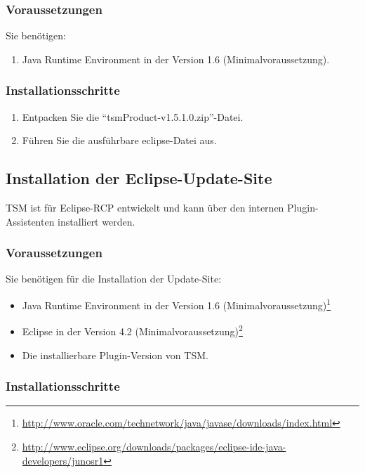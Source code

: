 \documentclass[11pt,a4paper,titlepage]{article}
\begin{document}
\subsubsection{Voraussetzungen}
Sie benötigen:
\begin{enumerate}
 \item Java Runtime Environment in der Version 1.6 (Minimalvoraussetzung).
\end{enumerate}

\subsubsection{Installationsschritte}
\begin{enumerate}
 \item Entpacken Sie die "`tsmProduct-v1.5.1.0.zip"'-Datei.
 \item Führen Sie die ausführbare eclipse-Datei aus.
\end{enumerate}


\subsection{Installation der Eclipse-Update-Site}
TSM ist für Eclipse-RCP entwickelt und kann über den internen Plugin-Assistenten installiert werden.


\subsubsection{Voraussetzungen}
Sie benötigen für die Installation der Update-Site:
\begin{itemize}
 \item Java Runtime Environment in der Version 1.6 (Minimalvoraussetzung)\footnote{\href{http://www.oracle.com/technetwork/java/javase/downloads/index.html}{http://www.oracle.com/technetwork/java/javase/downloads/index.html}}
 \item Eclipse in der Version 4.2 (Minimalvoraussetzung)\footnote{\href{http://www.eclipse.org/downloads/packages/eclipse-ide-java-developers/junosr1}{http://www.eclipse.org/downloads/packages/eclipse-ide-java-developers/junosr1}}
 \item Die installierbare Plugin-Version von TSM.
\end{itemize}

\subsubsection{Installationsschritte}
\end{document}
